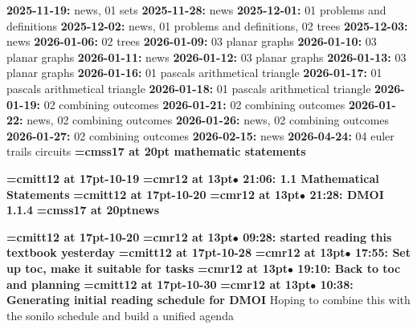 {\noindent \bf 2025-11-19:} news, 01 sets\smallskip
{\noindent \bf 2025-11-28:} news\smallskip
{\noindent \bf 2025-12-01:} 01 problems and definitions\smallskip
{\noindent \bf 2025-12-02:} news, 01 problems and definitions, 02 trees\smallskip
{\noindent \bf 2025-12-03:} news\smallskip
{\noindent \bf 2026-01-06:} 02 trees\smallskip
{\noindent \bf 2026-01-09:} 03 planar graphs\smallskip
{\noindent \bf 2026-01-10:} 03 planar graphs\smallskip
{\noindent \bf 2026-01-11:} news\smallskip
{\noindent \bf 2026-01-12:} 03 planar graphs\smallskip
{\noindent \bf 2026-01-13:} 03 planar graphs\smallskip
{\noindent \bf 2026-01-16:} 01 pascals arithmetical triangle\smallskip
{\noindent \bf 2026-01-17:} 01 pascals arithmetical triangle\smallskip
{\noindent \bf 2026-01-18:} 01 pascals arithmetical triangle\smallskip
{\noindent \bf 2026-01-19:} 02 combining outcomes\smallskip
{\noindent \bf 2026-01-21:} 02 combining outcomes\smallskip
{\noindent \bf 2026-01-22:} news, 02 combining outcomes\smallskip
{\noindent \bf 2026-01-26:} news, 02 combining outcomes\smallskip
{\noindent \bf 2026-01-27:} 02 combining outcomes\smallskip
{\noindent \bf 2026-02-15:} news\smallskip
{\noindent \bf 2026-04-24:} 04 euler trails circuits\smallskip
\vfill \break
{}
{\medskip\noindent\bf\font\titlefont=cmss17 at 20pt mathematic statements}\medskip

{\medskip\noindent\bf\font\titlefont=cmitt12 at 17pt-10-19}\medskip
{\smallskip\noindent\bf\font\titlefont=cmr12 at 13pt\titlefont $\bullet$ 21:06: 1.1 Mathematical Statements}\smallskip
{\medskip\noindent\bf\font\titlefont=cmitt12 at 17pt-10-20}\medskip
{\smallskip\noindent\bf\font\titlefont=cmr12 at 13pt\titlefont $\bullet$ 21:28: DMOI 1.1.4}\smallskip
{}
{\medskip\noindent\bf\font\titlefont=cmss17 at 20pt\titlefont news}\medskip

{\medskip\noindent\bf\font\titlefont=cmitt12 at 17pt-10-20}\medskip
{\smallskip\noindent\bf\font\titlefont=cmr12 at 13pt\titlefont $\bullet$ 09:28: started reading this textbook yesterday}\smallskip
{\medskip\noindent\bf\font\titlefont=cmitt12 at 17pt-10-28}\medskip
{\smallskip\noindent\bf\font\titlefont=cmr12 at 13pt\titlefont $\bullet$ 17:55: Set up toc, make it suitable for tasks}\smallskip
{\smallskip\noindent\bf\font\titlefont=cmr12 at 13pt\titlefont $\bullet$ 19:10: Back to toc and planning}\smallskip
{\medskip\noindent\bf\font\titlefont=cmitt12 at 17pt-10-30}\medskip
{\smallskip\noindent\bf\font\titlefont=cmr12 at 13pt\titlefont $\bullet$ 10:38: Generating initial reading schedule for DMOI}\smallskip
Hoping to combine this with the sonilo schedule and build a unified agenda
\par

